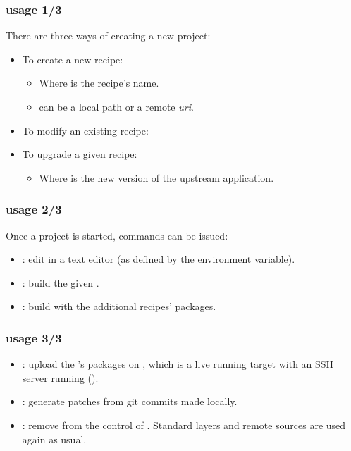 \begin{frame}
  \frametitle{ usage 1/3}
  There are three ways of creating a new  project:
  \begin{itemize}
    \item To create a new recipe:
      \begin{itemize}
        \item Where  is the recipe's name.
        \item {} can be a local path or a remote {\em
          uri}.
      \end{itemize}
    \item To modify an existing recipe: 
    \item To upgrade a given recipe:
      \begin{itemize}
        \item Where  is the new version of the upstream
          application.
      \end{itemize}
  \end{itemize}
\end{frame}

\begin{frame}
  \frametitle{ usage 2/3}
  Once a  project is started, commands can be issued:
  \begin{itemize}
    \item {}: edit  in a text
      editor (as defined by the  environment variable).
    \item {}: build the given
      .
    \item {}: build  with
      the additional  recipes' packages.
  \end{itemize}
\end{frame}

\begin{frame}
  \frametitle{ usage 3/3}
  \begin{itemize}
    \item {}: upload the
      's packages on , which is a live
      running target with an SSH server running ().
    \item {}: generate patches from
      git commits made locally.
    \item {}: remove  from the
      control of . Standard layers and remote sources
      are used again as usual.
  \end{itemize}
\end{frame}

